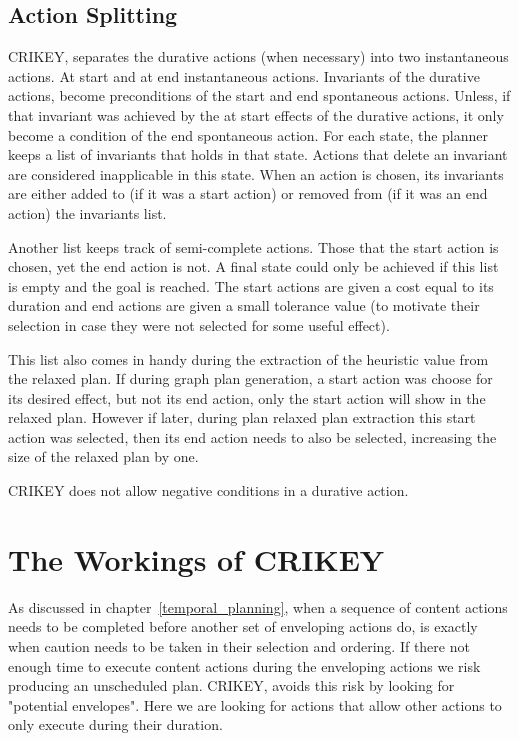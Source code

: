 \documentclass
[a4paper
,english
,parskip=half
,bibliography=totoc
]{scrreprt}
\begin{document}
    \subsection{Action Splitting} \label{split}
    CRIKEY, separates the durative actions (when necessary) into two instantaneous actions.
    At start and at end instantaneous actions.
    Invariants of the durative actions, become preconditions of the start and end spontaneous actions. Unless, if that invariant was achieved by the at start effects of the durative actions, it only become a condition of the end spontaneous action. For each state, the planner keeps a list of invariants that holds in that state. Actions that delete an invariant are considered inapplicable in this state. When an action is chosen, its invariants are either added to (if it was a start action) or removed from (if it was an end action) the invariants list.

    Another list keeps track of semi-complete actions. Those that the start action is chosen, yet the end action is not. A final state could only be achieved if this list is empty and the goal is reached. The start actions are given a cost equal to its duration and end actions are given a small tolerance value (to motivate their selection in case they were not selected for some useful effect).

    This list also comes in handy during the extraction of the heuristic value from the relaxed plan. If during graph plan generation, a start action was choose for its desired effect, but not its end action, only the start action will show in the relaxed plan. However if later, during plan relaxed plan extraction this start action was selected, then its end action needs to also be selected, increasing the size of the relaxed plan by one.

    CRIKEY does not allow negative conditions in a durative action.

    \section{The Workings of CRIKEY} \label{workings}
    As discussed in chapter~\ref{temporal_planning}, when a sequence of content actions needs to be completed before another set of enveloping actions do, is exactly when caution needs to be taken in their selection and ordering. If there not enough time to execute content actions during the enveloping actions we risk producing an unscheduled plan. CRIKEY, avoids this risk by looking for "potential envelopes". Here we are looking for actions that allow other actions to only execute during their duration.
\end{document}
